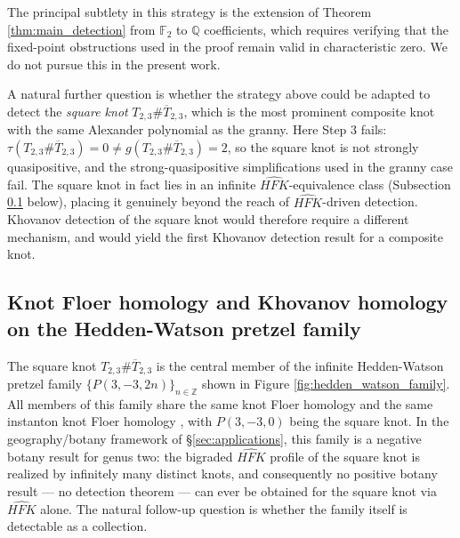 The principal subtlety in this strategy is the extension of Theorem \ref{thm:main_detection} from $\mathbb{F}_2$ to $\mathbb{Q}$ coefficients, which requires verifying that the fixed-point obstructions used in the proof remain valid in characteristic zero. We do not pursue this in the present work.

A natural further question is whether the strategy above could be adapted to detect the \emph{square knot} $T_{2,3} \# \overline{T}_{2,3}$, which is the most prominent composite knot with the same Alexander polynomial as the granny. Here Step 3 fails: $\tau(T_{2,3} \# \overline{T}_{2,3}) = 0 \neq g(T_{2,3} \# \overline{T}_{2,3}) = 2$, so the square knot is not strongly quasipositive, and the strong-quasipositive simplifications used in the granny case fail. The square knot in fact lies in an infinite $\widehat{HFK}$-equivalence class (Subsection \ref{subsec:hfk_kh_pretzel} below), placing it genuinely beyond the reach of $\widehat{HFK}$-driven detection. Khovanov detection of the square knot would therefore require a different mechanism, and would yield the first Khovanov detection result for a composite knot.

\subsection{Knot Floer homology and Khovanov homology on the Hedden-Watson pretzel family}
\label{subsec:hfk_kh_pretzel}

The square knot $T_{2,3} \# \overline{T}_{2,3}$ is the central member of the infinite Hedden-Watson pretzel family $\{P(3,-3,2n)\}_{n\in\mathbb{Z}}$ shown in Figure \ref{fig:hedden_watson_family}. All members of this family share the same knot Floer homology and the same instanton knot Floer homology \cite{HeddenWatson2018,Wang2020}, with $P(3,-3,0)$ being the square knot. In the geography/botany framework of \S\ref{sec:applications}, this family is a negative botany result for genus two: the bigraded $\widehat{HFK}$ profile of the square knot is realized by infinitely many distinct knots, and consequently no positive botany result --- no detection theorem --- can ever be obtained for the square knot via $\widehat{HFK}$ alone. The natural follow-up question is whether the family itself is detectable as a collection.


